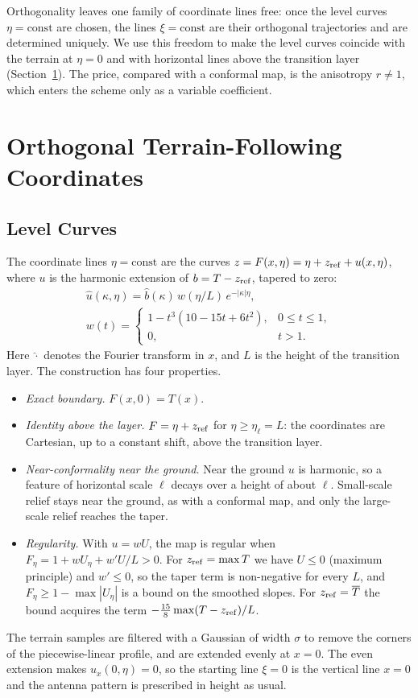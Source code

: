 \documentclass[journal]{IEEEtran}
\newcommand{\etal}{\eta_{\ell}}
\begin{document}
Orthogonality leaves one family of coordinate lines free: once the level curves
$\eta=\text{const}$ are chosen, the lines $\xi=\text{const}$ are their
orthogonal trajectories and are determined uniquely. We use this freedom to
make the level curves coincide with the terrain at $\eta=0$ and with horizontal
lines above the transition layer (Section~\ref{sec:map}). The price, compared
with a conformal map, is the anisotropy $r\ne1$, which enters the scheme only as
a variable coefficient.

\section{Orthogonal Terrain-Following Coordinates}\label{sec:map}

\subsection{Level Curves}
The coordinate lines $\eta=\text{const}$ are the curves
$z=F(x,\eta)=\eta+z_{\rm ref}+u(x,\eta)$, where $u$ is the harmonic extension of
$b=T-z_{\rm ref}$, tapered to zero:
\begin{gather}
\hat u(\kappa,\eta)=\hat b(\kappa)\,w(\eta/L)\,e^{-|\kappa|\eta},\label{eq:family}\\
w(t)=\begin{cases}1-t^3(10-15t+6t^2), & 0\le t\le1,\\ 0, & t>1.\end{cases}\nonumber
\end{gather}
Here $\hat{\cdot}$ denotes the Fourier
transform in $x$, and $L$ is the height of the transition layer. The
construction has four properties.
\begin{itemize}
\item \emph{Exact boundary.} $F(x,0)=T(x)$.
\item \emph{Identity above the layer.} $F=\eta+z_{\rm ref}$ for $\eta\ge\etal=L$:
the coordinates are Cartesian, up to a constant shift, above the transition
layer.
\item \emph{Near-conformality near the ground.} Near the ground $u$ is harmonic,
so a feature of horizontal scale $\ell$ decays over a height of about $\ell$.
Small-scale relief stays near the ground, as with a conformal map, and only
the large-scale relief reaches the taper.
\item \emph{Regularity.} With $u=wU$, the map is regular when
$F_\eta=1+wU_\eta+w'U/L>0$. For $z_{\rm ref}=\max T$ we have $U\le0$ (maximum
principle) and $w'\le0$, so the taper term is non-negative for every $L$, and
$F_\eta\ge1-\max|U_\eta|$ is a bound on the smoothed slopes. For
$z_{\rm ref}=\overline T$ the bound acquires the term
$-\frac{15}{8}\max(T-z_{\rm ref})/L$.
\end{itemize}
The terrain samples are filtered with a Gaussian of width $\sigma$ to remove the
corners of the piecewise-linear profile, and are extended evenly at $x=0$. The
even extension makes $u_x(0,\eta)=0$, so the starting line $\xi=0$ is the
vertical line $x=0$ and the antenna pattern is prescribed in height as usual.
\end{document}

